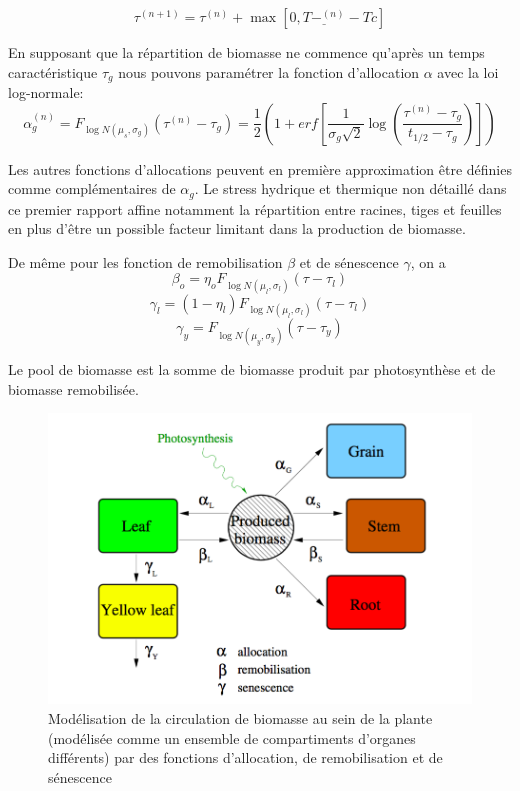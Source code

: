 \[ {\tau}^{(n+1)}=\tau^{(n)}+\max[0,\underline{T-^{(n)}}-Tc] \]

En supposant que la répartition de biomasse ne commence qu'après un temps caractéristique $\tau_g$ nous pouvons paramétrer la fonction d'allocation $\alpha$ avec la loi log-normale:
\[ {\alpha_g^{(n)}}=F_{\log N(\mu_s,\sigma_g)}(\tau^{(n)}-\tau_g)=\frac{1}{2} (1+erf[\frac{1}{\sigma_g \sqrt{2}}\log (\frac{\tau^{(n)}-\tau_g}{t_{1/2}-\tau_g})]) \]

Les autres fonctions d'allocations peuvent en première approximation être définies comme complémentaires de $\alpha_g$. Le stress hydrique et thermique non détaillé dans ce premier rapport affine notamment la répartition entre racines, tiges et feuilles en plus d'être un possible facteur limitant dans la production de biomasse.

De même pour les fonction de remobilisation $\beta $ et de sénescence $\gamma$, on a
\[ {\beta_o}=\eta_o F_{\log N(\mu_l, \sigma_l)}(\tau-\tau_l) \]
\[ {\gamma_l}=(1-\eta_l)F_{\log N(\mu_l, \sigma_l)}(\tau-\tau_l) \]
\[ {\gamma_y}=F_{\log N(\mu_y, \sigma_y)}(\tau-\tau_y) \]

Le pool de biomasse est la somme de biomasse produit par photosynthèse et de biomasse remobilisée.
\begin{figure}[h]
  \includegraphics[scale=0.51]{./img/schema-lnas.png}
  \caption{Modélisation de la circulation de biomasse au sein de la plante (modélisée comme un ensemble de compartiments d'organes différents) par des fonctions d'allocation, de remobilisation et de sénescence}
  \label{fig:planning_gant}
\end{figure}

